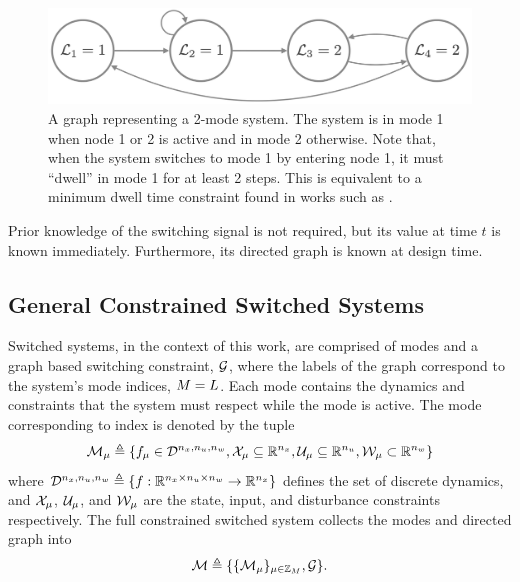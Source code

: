 \begin{figure}[t]
\centering
\includegraphics[scale=0.15]{./figures/graph_remark}
\caption{A graph representing a 2-mode system. The system is in mode 1 when node 1 or 2 is active and in mode 2 otherwise. Note that, when the system switches to mode 1 by entering node 1, it must ``dwell'' in mode 1 for at least 2 steps. This is equivalent to a minimum dwell time constraint found in works such as \cite{Danielson2019}.}
\label{fig:graph_ex}
\end{figure}

Prior knowledge of the switching signal is not required, but its value at time $t$ is known immediately. Furthermore, its directed graph is known at design time. 
\subsection{General Constrained Switched Systems}
Switched systems, in the context of this work, are comprised of \nummodes modes and a graph based switching constraint, $\mathcal{G}$, where the labels of the graph correspond to the system's mode indices, $\nummodes=\gnumlabels$. Each mode contains the dynamics and constraints that the system must respect while the mode is active. The mode corresponding to index \modeidx is denoted by the tuple
\begin{equation}
\mode{\modeidx}\triangleq\{f_\modeidx\in \mathcal{D}^{\nx,\nu,\nw}, \xcon[\modeidx]\subseteq\real^\nx, \ucon[\modeidx]\subseteq\real^\nu, \wcon[\modeidx]\subset\real^\nw\}\nonumber
\end{equation}
where $\mathcal{D}^{{n_x},{n_u},{n_w}}\triangleq\{f:\mathbb{R}^{{n_x}\times{n_u}\times{n_w}}\rightarrow\mathbb{R}^{{n_x}}\}$ defines the set of discrete dynamics,  and $\xcon[\modeidx]$, $\ucon[\modeidx]$, and  $\wcon[\modeidx]$ are the state, input, and disturbance constraints respectively. The full constrained switched system collects the modes and directed graph into
\begin{equation}\label{eq:basic_switched_sys}
\modes\triangleq\{\{\mode{\modeidx}\}_{\modeidx\in\idxset{\nummodes}}, \graph\}.
\end{equation}

